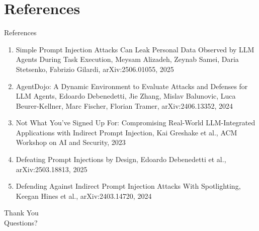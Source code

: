 \documentclass[10pt]{beamer}
\begin{document}
\section{References}
\begin{frame}[allowframebreaks]{References}
  \footnotesize
  \begin{enumerate}
    \item Simple Prompt Injection Attacks Can Leak Personal Data Observed by LLM Agents During Task Execution, Meysam Alizadeh, Zeynab Samei, Daria Stetsenko, Fabrizio Gilardi, arXiv:2506.01055, 2025
    \item AgentDojo: A Dynamic Environment to Evaluate Attacks and Defenses for LLM Agents, Edoardo Debenedetti, Jie Zhang, Mislav Balunovic, Luca Beurer-Kellner, Marc Fischer, Florian Tramer, arXiv:2406.13352, 2024
    \item Not What You've Signed Up For: Compromising Real-World LLM-Integrated Applications with Indirect Prompt Injection, Kai Greshake et al., ACM Workshop on AI and Security, 2023
    \item Defeating Prompt Injections by Design, Edoardo Debenedetti et al., arXiv:2503.18813, 2025
    \item Defending Against Indirect Prompt Injection Attacks With Spotlighting, Keegan Hines et al., arXiv:2403.14720, 2024
  \end{enumerate}
\end{frame}

\begin{frame}[plain]
  \begin{center}
    {\Huge Thank You}\\[1em]
    {\large Questions?}
  \end{center}
\end{frame}
\end{document}
